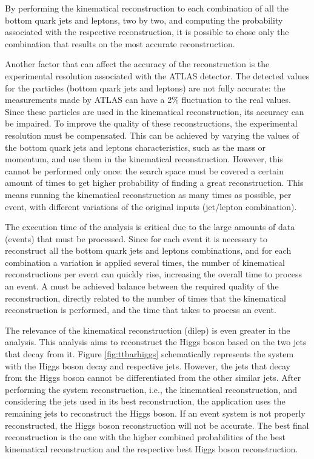 By performing the kinematical reconstruction to each combination of all the bottom quark jets and leptons, two by two, and computing the probability associated with the respective reconstruction, it is possible to chose only the combination that results on the most accurate reconstruction.

Another factor that can affect the accuracy of the reconstruction is the experimental resolution associated with the ATLAS detector. The detected values for the particles (bottom quark jets and leptons) are not fully accurate: the measurements made by ATLAS can have a 2\% fluctuation to the real values. Since these particles are used in the kinematical reconstruction, its accuracy can be impaired. To improve the quality of these reconstructions, the experimental resolution must be compensated. This can be achieved by varying the values of the bottom quark jets and leptons characteristics, such as the mass or momentum, and use them in the kinematical reconstruction. However, this cannot be performed only once: the search space must be covered a certain amount of times to get higher probability of finding a great reconstruction. This means running the kinematical reconstruction as many times as possible, per event, with different variations of the original inputs (jet/lepton combination).

The execution time of the analysis is critical due to the large amounts of data (events) that must be processed. Since for each event it is necessary to reconstruct all the bottom quark jets and leptons combinations, and for each combination a variation is applied several times, the number of kinematical reconstructions per event can quickly rise, increasing the overall time to process an event. A must be achieved balance between the required quality of the reconstruction, directly related to the number of times that the kinematical reconstruction is performed, and the time that takes to process an event. 

The relevance of the kinematical reconstruction (dilep) is even greater in the \tth analysis. This analysis aims to reconstruct the Higgs boson based on the two jets that decay from it. Figure \ref{fig:ttbarhiggs} schematically represents the \ttbar system with the Higgs boson decay and respective jets. However, the jets that decay from the Higgs boson cannot be differentiated from the other similar jets. After performing the \ttbar system reconstruction, i.e., the kinematical reconstruction, and considering the jets used in its best reconstruction, the application uses the remaining jets to reconstruct the Higgs boson. If an event \ttbar system is not properly reconstructed, the Higgs boson reconstruction will not be accurate. The best final reconstruction is the one with the higher combined probabilities of the best kinematical reconstruction and the respective best Higgs boson reconstruction. 


